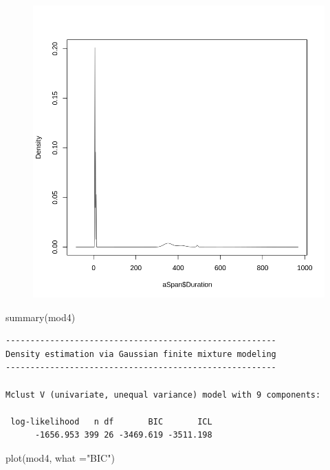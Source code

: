 \documentclass[
  letterpaper,
  DIV=11,
  numbers=noendperiod]{scrartcl}
\newenvironment{Shaded}{\begin{snugshade}}{\end{snugshade}}
\newcommand{\AttributeTok}[1]{\textcolor[rgb]{0.40,0.45,0.13}{#1}}
\newcommand{\FunctionTok}[1]{\textcolor[rgb]{0.28,0.35,0.67}{#1}}
\newcommand{\NormalTok}[1]{\textcolor[rgb]{0.00,0.23,0.31}{#1}}
\newcommand{\StringTok}[1]{\textcolor[rgb]{0.13,0.47,0.30}{#1}}
\begin{document}
\begin{figure}[H]

{\centering \includegraphics{dss-span-analysis-rev5_files/figure-pdf/cell-33-output-1.png}

}

\end{figure}

\begin{Shaded}
\begin{Highlighting}[]
\FunctionTok{summary}\NormalTok{(mod4)}
\end{Highlighting}
\end{Shaded}

\begin{verbatim}
------------------------------------------------------- 
Density estimation via Gaussian finite mixture modeling 
------------------------------------------------------- 

Mclust V (univariate, unequal variance) model with 9 components: 

 log-likelihood   n df       BIC       ICL
      -1656.953 399 26 -3469.619 -3511.198
\end{verbatim}

\begin{Shaded}
\begin{Highlighting}[]
\FunctionTok{plot}\NormalTok{(mod4, }\AttributeTok{what =}\StringTok{"BIC"}\NormalTok{)}
\end{Highlighting}
\end{Shaded}
\end{document}
